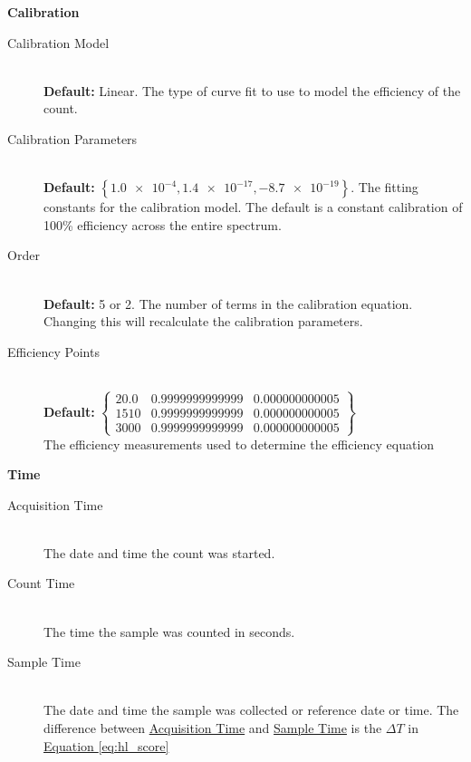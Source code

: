 \documentclass[12pt,report,justified]{SANDreport}
\begin{document}
\begin{center}
{\large \textbf{Calibration}}
\end{center}
\begin{description}
\item[Calibration Model]\label{itm:cal_model} \hfill \\
\textbf{Default:} Linear. The type of curve fit to use to model the efficiency of the count.
\item[Calibration Parameters]\label{itm:cal_coeff} \hfill \\
\textbf{Default:} \( \left\{ \num{1.0e-4}, \num{1.4e-17}, \num{-8.7e-19}  \right\}\). The fitting constants for the
calibration model. The default is a constant calibration of 100\% efficiency across the entire
spectrum.
\item[Order]\label{itm:cal_order} \hfill \\
 \textbf{Default:} 5 or 2. The number of terms in the calibration equation. Changing this will recalculate
the calibration parameters.
\item[Efficiency Points]\label{itm:eff_pts} \hfill \\
 \textbf{Default:} \(
\left\{ \begin{matrix}
20.0 & 0.9999999999999 & 0.000000000005 \\
1510 & 0.9999999999999 & 0.000000000005  \\
3000 & 0.9999999999999 & 0.000000000005
 \end{matrix}
 \right\} \) \\
The efficiency measurements used to determine the efficiency equation
\end{description}

\begin{center}
{\large \textbf{Time}}
\end{center}
\begin{description}
\item[Acquisition Time]\label{itm:time_acq} \hfill \\
The date and time the count was started.
\item[Count Time]\label{itm:time_cnt} \hfill \\
The time the sample was counted in seconds.
\item[Sample Time]\label{itm:time_smp} \hfill \\
The date and time the sample was collected or reference date or time. The difference between
\hyperref[itm:time_acq]{Acquisition Time} and \hyperref[itm:time_cnt]{Sample Time} is the
\(\Delta T\) in \hyperref[eq:hl_score]{Equation \ref{eq:hl_score}}
\end{description}
\end{document}
